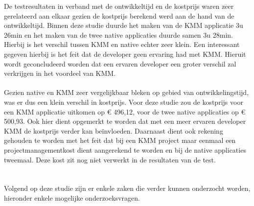 De testresultaten in verband met de ontwikkeltijd en de kostprijs waren zeer gerelateerd aan elkaar gezien de kostprijs berekend werd aan de hand van de ontwikkeltijd. Binnen deze studie duurde het maken van de KMM applicatie 3u 26min en het maken van de twee native applicaties duurde samen 3u 28min. Hierbij is het verschil tussen KMM en native echter zeer klein. Een interessant gegeven hierbij is het feit dat de developer geen ervaring had met KMM. Hieruit wordt geconcludeerd worden dat een ervaren developer een groter verschil zal verkrijgen in het voordeel van KMM.
\\ \\
Gezien native en KMM zeer vergelijkbaar bleken op gebied van ontwikkelingstijd, was er dus een klein verschil in kostprijs. Voor deze studie zou de kostprijs voor een KMM applicatie uitkomen op \euro{} 496,12, voor de twee native applicaties op \euro{} 500,93. Ook hier dient opgemerkt te worden dat met een meer ervaren developer KMM de kostprijs verder kan beïnvloeden. Daarnaast dient ook rekening gehouden te worden met het feit dat bij een KMM project maar eenmaal een projectmanagementkost dient aangerekend te worden en bij de native applicaties tweemaal. Deze kost zit nog niet verwerkt in de resultaten van de test.

\section{}
\label{sec:C-verder-onderzoek}
Volgend op deze studie zijn er enkele zaken die verder kunnen onderzocht worden, hieronder enkele mogelijke onderzoeksvragen.

